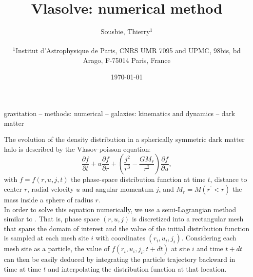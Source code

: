 \documentclass[useAMS,usenatbib]{mn2e}
\title{Vlasolve: numerical method}
\author[]{Sousbie, Thierry$^1$\\
\\
$^1$Institut d'Astrophysique de Paris, CNRS UMR 7095 and UPMC, 98bis, bd Arago, F-75014 Paris, France}
\begin{document}
\voffset -1cm
\date{\today}
\pagerange{\pageref{firstpage}--\pageref{lastpage}} 
\maketitle
\label{firstpage}
\begin{abstract}

\end{abstract}
\begin{keywords}
gravitation -- 
methods: numerical -- 
galaxies: kinematics and dynamics --
dark matter
\end{keywords}

The evolution of the density distribution in a spherically symmetric dark matter halo is described by the Vlasov-poisson equation:
\begin{equation}
\frac{\partial f}{\partial t}+u\frac{\partial f}{\partial r}+\left(\frac{j^2}{r^3}-\frac{GM_r}{r^2}\right)\frac{\partial f}{\partial u},
\label{eq:vl}
\end{equation}
with $f=f\left(r,u,j,t\right)$ the phase-space distribution function at time $t$, distance to center $r$, radial velocity $u$ and angular momentum $j$, and $M_r=M\left(r^\prime<r\right)$ the mass inside a sphere of radius $r$.\\

In order to solve this equation numerically, we use a semi-Lagrangian method similar to \cite{Fuji83}. That is, phase space $\left(r,u,j\right)$ is discretized into a rectangular mesh that spans the domain of interest and the value of the initial distribution function is sampled at each mesh site $i$ with coordinates $\left(r_i,u_i,j_i\right)$. Considering each mesh site as a particle, the value of $f\left(r_i,u_i,j_i,t+dt\right)$ at site $i$ and time $t+dt$ can then be easily deduced by integrating the particle trajectory backward in time at time $t$ and interpolating the distribution function at that location.\\
\end{document}
